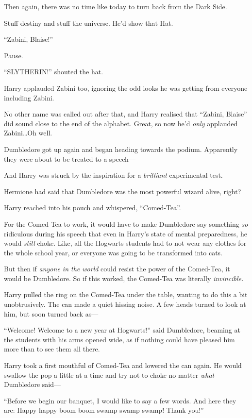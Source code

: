 Then again, there was no time like today to turn back from the Dark Side.

Stuff destiny and stuff the universe. He’d show that Hat.

“Zabini, Blaise!”

Pause.

“SLYTHERIN!” shouted the hat.

Harry applauded Zabini too, ignoring the odd looks he was getting from everyone including Zabini.

No other name was called out after that, and Harry realised that “Zabini, Blaise” did sound close to the end of the alphabet. Great, so now he’d \emph{only} applauded Zabini…Oh well.

Dumbledore got up again and began heading towards the podium. Apparently they were about to be treated to a speech—

And Harry was struck by the inspiration for a \emph{brilliant} experimental test.

Hermione had said that Dumbledore was the most powerful wizard alive, right?

Harry reached into his pouch and whispered, “Comed-Tea”.

For the Comed-Tea to work, it would have to make Dumbledore say something \emph{so} ridiculous during his speech that even in Harry’s state of mental preparedness, he would \emph{still} choke. Like, all the Hogwarts students had to not wear any clothes for the whole school year, or everyone was going to be transformed into cats.

But then if \emph{anyone in the world} could resist the power of the Comed-Tea, it would be Dumbledore. So if this worked, the Comed-Tea was literally \emph{invincible.}

Harry pulled the ring on the Comed-Tea under the table, wanting to do this a bit unobtrusively. The can made a quiet hissing noise. A few heads turned to look at him, but soon turned back as—

“Welcome! Welcome to a new year at Hogwarts!” said Dumbledore, beaming at the students with his arms opened wide, as if nothing could have pleased him more than to see them all there.

Harry took a first mouthful of Comed-Tea and lowered the can again. He would swallow the pop a little at a time and try not to choke no matter \emph{what} Dumbledore said—

“Before we begin our banquet, I would like to say a few words. And here they are: Happy happy boom boom swamp swamp swamp! Thank you!”

